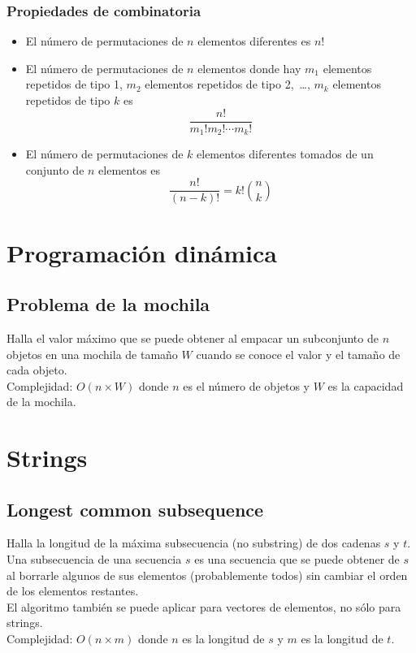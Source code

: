 \documentclass[10pt,letterpaper,twocolumn]{article}
\newcommand{\source}[1]{
	
	\dotfill
}
\begin{document}
		\subsubsection{Propiedades de combinatoria}
		\begin{itemize}
			\item El número de permutaciones de $n$ elementos diferentes es $n!$
			\item El número de permutaciones de $n$ elementos donde hay $m_1$ elementos repetidos de tipo 1, $m_2$ elementos repetidos de tipo 2,~\ldots, $m_k$ elementos repetidos de tipo $k$ es $$\frac{n!}{m_1! m_2! \cdots m_k!} $$
			\item El número de permutaciones de $k$ elementos diferentes tomados de un conjunto de $n$ elementos es $$ \frac{n!}{(n-k)!} = k! \binom{n}{k}$$
		\end{itemize}
		
		
	
\section{Programación dinámica}
	\subsection{Problema de la mochila}
	Halla el valor máximo que se puede obtener al empacar un subconjunto de $n$ objetos en una mochila de tamaño $W$ cuando se conoce el valor y el tamaño de cada objeto.\\
	Complejidad: $O(n \times W)$ donde $n$ es el número de objetos y $W$ es la capacidad de la mochila.\\
	\source{./src/knapsack.cpp}
	
	
\section{Strings}
	\subsection{Longest common subsequence}
	Halla la longitud de la máxima subsecuencia (no substring) de dos cadenas $s$ y $t$.\\
	Una subsecuencia de una secuencia $s$ es una secuencia que se puede obtener de $s$ al borrarle algunos de sus elementos (probablemente todos) sin cambiar el orden de los elementos restantes.\\
	El algoritmo también se puede aplicar para vectores de elementos, no sólo para strings.\\
	Complejidad: $O(n \times m)$ donde $n$ es la longitud de $s$ y $m$ es la longitud de $t$.\\
	\source{./src/lcs.cpp}
	
\end{document}
